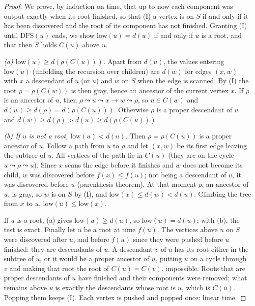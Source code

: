 \begin{proof}
We prove, by induction on time, that up to now each component was output exactly when its root finished, so that (I) a vertex is on $S$ if and only if it has been discovered and the root of
its component has not finished. Granting (I) until $\mathrm{DFS}(u)$ ends, we show $\mathrm{low}(u)=d(u)$ if and only if $u$ is a root, and that then $S$ holds $C(u)$ above $u$.

\emph{(a) $\mathrm{low}(u)\ge d(\rho(C(u)))$.} Apart from $d(u)$, the values entering $\mathrm{low}(u)$ (unfolding the recursion over children) are $d(w)$ for edges $(x,w)$ with $x$ a descendant of $u$ (or $u$)
and $w$ on $S$ when the edge is scanned. By (I) the root $\rho=\rho(C(w))$ is then gray, hence an ancestor of the current vertex $x$. If $\rho$ is an ancestor of $u$, then $\rho\leadsto u\leadsto x\to w\leadsto\rho$,
so $u\in C(w)$ and $d(w)\ge d(\rho)=d(\rho(C(u)))$. Otherwise $\rho$ is a proper descendant of $u$ and $d(w)\ge d(\rho)>d(u)\ge d(\rho(C(u)))$.

\emph{(b) If $u$ is not a root, $\mathrm{low}(u)<d(u)$.} Then $\rho=\rho(C(u))$ is a proper ancestor of $u$. Follow a path from $u$ to $\rho$ and let $(x,w)$ be its first edge leaving the subtree of $u$. All vertices of the path
lie in $C(u)$ (they are on the cycle $u\leadsto\rho\leadsto u$). Since $x$ scans the edge before it finishes and $w$ does not become its child, $w$ was discovered before $f(x)\le f(u)$; not being a descendant of $u$, it
was discovered before $u$ (parenthesis theorem). At that moment $\rho$, an ancestor of $u$, is gray, so $w$ is on $S$ by (I), and $\mathrm{low}(x)\le d(w)<d(u)$. Climbing the tree from $x$ to $u$, $\mathrm{low}(u)\le\mathrm{low}(x)$.

If $u$ is a root, (a) gives $\mathrm{low}(u)\ge d(u)$, so $\mathrm{low}(u)=d(u)$; with (b), the test is exact. Finally let $u$ be a root at time $f(u)$. The vertices above $u$ on $S$ were discovered after $u$, and before $f(u)$
since they were pushed before $u$ finished: they are descendants of $u$. A descendant $v$ of $u$ has its root either in the subtree of $u$, or it would be a proper ancestor of $u$, putting $u$ on a cycle
through $v$ and making that root the root of $C(u)=C(v)$, impossible. Roots that are proper descendants of $u$ have finished and their components were removed; what remains above $u$ is exactly
the descendants whose root is $u$, which is $C(u)$. Popping them keeps (I). Each vertex is pushed and popped once: linear time.
\end{proof}

